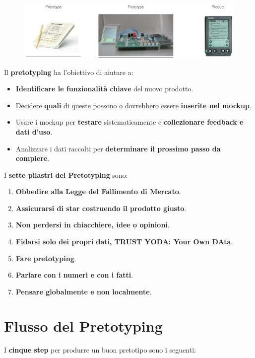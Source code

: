 \documentclass[a4paper,11pt,oneside]{book}
\begin{document}
\pagebreak

\begin{figure}[!h]
	\centering
	\includegraphics[scale=0.65]{immagini/Pre_prot.png}
\end{figure}

Il \textbf{pretotyping} ha l'obiettivo di aiutare a:

\begin{itemize}
	\item \textbf{Identificare le funzionalità chiave} del nuovo prodotto.
	\item Decidere \textbf{quali} di queste possono o dovrebbero essere \textbf{inserite nel mockup}.
	\item Usare i mockup per \textbf{testare} sistematicamente e \textbf{collezionare feedback e dati d'uso}.
	\item Analizzare i dati raccolti per \textbf{determinare il prossimo passo da compiere}.
\end{itemize}

I \textbf{sette pilastri del Pretotyping} sono:

\begin{enumerate}
	\item \textbf{Obbedire alla Legge del Fallimento di Mercato}.
	\item \textbf{Assicurarsi di star costruendo il prodotto giusto}.
	\item \textbf{Non perdersi in chiacchiere, idee o opinioni}.
	\item \textbf{Fidarsi solo dei propri dati, \textbf{TRUST YODA: Your Own DAta}}.
	\item \textbf{Fare pretotyping}.
	\item \textbf{Parlare con i numeri e con i fatti}.
	\item \textbf{Pensare globalmente e non localmente}.
\end{enumerate}

\section{Flusso del Pretotyping}

I \textbf{cinque step} per produrre un buon pretotipo sono i seguenti:
\end{document}
